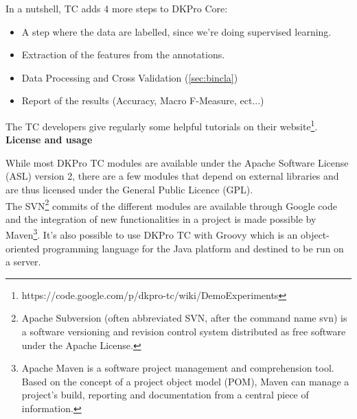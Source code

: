 In a nutshell, TC adds 4 more steps to DKPro Core:
  \begin{itemize}
  \item A step where the data are labelled, since we're doing supervised learning. 
  \item Extraction of the features from the annotations.
  \item Data Processing and Cross Validation (\cref{sec:bincla})
  \item Report of the results (Accuracy, Macro F-Measure, ect...)
\end{itemize}  

The TC developers give regularly some helpful tutorials on their website\footnote{https://code.google.com/p/dkpro-tc/wiki/DemoExperiments}. 
\
\vspace{0.2cm}
\\
\textbf{License and usage}

While most DKPro TC modules are available under the Apache Software License (ASL) version 2, there are a few modules that depend on external libraries and are thus licensed under the General Public Licence (GPL). 
\\
The SVN\footnote{Apache Subversion (often abbreviated SVN, after the command name svn) is a software versioning and revision control system distributed as free software under the Apache License.} commits of the different modules are available through Google code and the integration of new functionalities in a project is made possible by Maven\footnote{Apache Maven is a software project management and comprehension tool. Based on the concept of a project object model (POM), Maven can manage a project's build, reporting and documentation from a central piece of information.}. It's also possible to use DKPro TC with Groovy which is an object-oriented programming language for the Java platform and destined to be run on a server. 

















